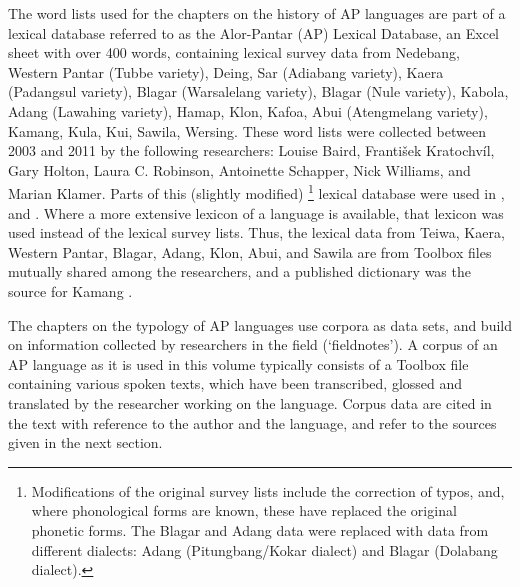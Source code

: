 The word lists used for the chapters on the history of AP languages are part of a lexical database referred to as the Alor-Pantar (AP) Lexical Database, an Excel sheet with over  400 words, containing lexical survey data from Nedebang, Western Pantar (Tubbe variety), Deing, Sar (Adiabang variety), Kaera (Padangsul variety), Blagar (Warsalelang variety), Blagar (Nule variety), Kabola, Adang (Lawahing variety), Hamap, Klon, Kafoa, Abui (Atengmelang variety), Kamang, Kula, Kui, Sawila, Wersing. These word lists were collected between 2003 and 2011 by the following researchers: Louise Baird, Franti\v{s}ek Kratochv\'il, Gary Holton, Laura C. Robinson, Antoinette Schapper, Nick Williams, and Marian Klamer. Parts of this (slightly modified){} \footnote{Modifications of the original survey lists include the correction of typos, and, where phonological forms are known, these have replaced the original phonetic forms. The Blagar and Adang data were replaced with data from different dialects: Adang (Pitungbang/Kokar dialect) and Blagar (Dolabang dialect).} lexical database were used in \citet{HoltonRobinsonTVhistory,HoltonRobinsonTVposition}, and \citet{SchapperEtAlTVtimor}. Where a more extensive lexicon of a language is available, that lexicon was used instead of the lexical survey lists. Thus, the lexical data from Teiwa, Kaera, Western Pantar, Blagar, Adang, Klon, Abui, and Sawila are from Toolbox files mutually shared among the researchers, and a published dictionary was the source for Kamang \citep{SchapperEtAl2011kamus}.

The chapters on the typology of AP languages use corpora as data sets, and build on information collected by researchers in the field (`fieldnotes'). A corpus of an AP language as it is used in this volume typically consists of a Toolbox file containing various spoken texts, which have been transcribed, glossed and translated by the researcher working on the language. Corpus data are cited in the text with reference to the author and the language, and refer to the  sources given in the next section.
 
 
